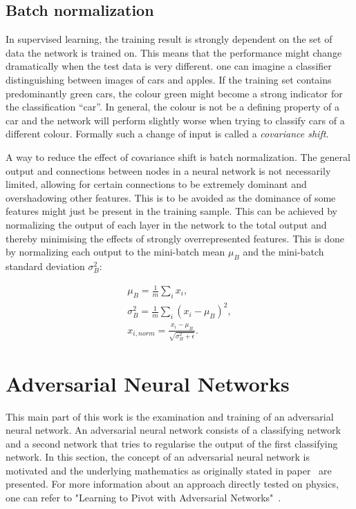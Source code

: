 \subsection{Batch normalization}
\label{sec:batch_norm}

In supervised learning, the training result is strongly dependent on the set of data the network is trained on. This means that the performance might change dramatically when the test data is very different. one can imagine a classifier distinguishing between images of cars and apples. If the training set contains predominantly green cars, the colour green might become a strong indicator for the classification \enquote{car}. In general, the colour is not be a defining property of a car and the network will perform slightly worse when trying to classify cars of a different colour. Formally such a change of input is called a \emph{covariance shift}.

A way to reduce the effect of covariance shift is batch normalization. The general output and connections between nodes in a neural network is not necessarily limited, allowing for certain connections to be extremely dominant and overshadowing other features. This is to be avoided as the dominance of some features might just be present in the training sample. This can be achieved by normalizing the output of each layer in the network to the total output and thereby minimising the effects of strongly overrepresented features. This is done by normalizing each output to the mini-batch mean $\mu_B$ and the mini-batch standard deviation $\sigma_B^2$:

\begin{align}
    \mu_B = \frac{1}{m} \sum_i x_i,\\
    \sigma_B^2 = \frac{1}{m} \sum_i (x_i - \mu_B)^2,\\
    x_{i,norm} = \frac{x_i - \mu_B}{\sqrt{\sigma_B^2 + \epsilon}}.
\end{align}





\section{Adversarial Neural Networks}

This main part of this work is the examination and training of an adversarial neural network. An adversarial neural network consists of a classifying network and a second network that tries to regularise the output of the first classifying network.
%
In this section, the concept of an adversarial neural network is motivated and the underlying mathematics as originally stated in paper~\cite{2014arXiv1406.2661G} are presented.
For more information about an approach directly tested on physics, one can refer to "Learning to Pivot with Adversarial Networks"~\cite{Louppe:2016ylz}.

